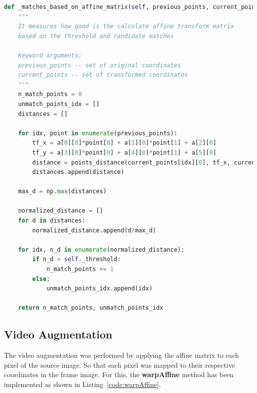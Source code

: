 \documentclass[]{IEEEtran}
\begin{document}
\begin{lstlisting}[language=Python, caption={Evaluates calculated Affine Transform matrix}, label={code:eval}]
  def _matches_based_on_affine_matrix(self, previous_points, current_points, a):
    """
    It measures how good is the calculate affine transform matrix
    based on the threshold and candidate matches

    Keyword arguments:
    previous_points -- set of original coordinates
    current_points -- set of transformed coordinates
    """
    n_match_points = 0
    unmatch_points_idx = []
    distances = []

    for idx, point in enumerate(previous_points):
        tf_x = a[0][0]*point[0] + a[1][0]*point[1] + a[2][0]
        tf_y = a[3][0]*point[0] + a[4][0]*point[1] + a[5][0]
        distance = points_distance(current_points[idx][0], tf_x, current_points[idx][1], tf_y)
        distances.append(distance)

    max_d = np.max(distances)

    normalized_distance = []
    for d in distances:
        normalized_distance.append(d/max_d)

    for idx, n_d in enumerate(normalized_distance):
        if n_d < self._threshold:
            n_match_points += 1
        else:
            unmatch_points_idx.append(idx)

    return n_match_points, unmatch_points_idx
\end{lstlisting}


\subsection{Video Augmentation}

The video augmentation was performed by applying the affine matrix to each pixel of the source image. So that each pixel was mapped to their respective coordinates in the frame image. For this, the \textbf{warpAffine} method has been implemented as shown in Listing~\ref{code:warpAffine}.
\end{document}
